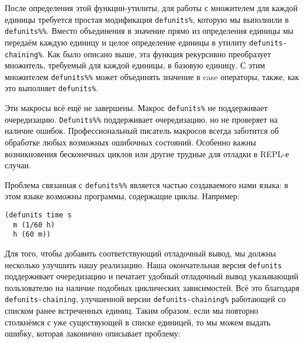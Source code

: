 После определения этой функции-утилиты, для работы с множителем для каждой единицы требуется простая модификация \verb"defunits%", которую мы выполнили в \verb"defunits%%". Вместо объединения в значение прямо из определения единицы мы передаём каждую единицу и целое определение единицы в утилиту \verb"defunits-chaining%". Как было описано выше, эта функция рекурсивно преобразует множитель, требуемый для каждой единицы, в базовую единицу. С этим множителем \verb"defunits%%" может объединять значение в case операторы, также, как это выполняет \verb"defunits%".

Эти макросы всё ещё не завершены. Макрос \verb"defunits%" не поддерживает очередизацию. \verb"Defunits%%" поддерживает очередизацию, но не проверяет на наличие ошибок. Профессиональный писатель макросов всегда заботится об обработке любых возможных ошибочных состояний. Особенно важны возникновения бесконечных циклов или другие трудные для отладки в REPL-е случаи.

Проблема связанная с \verb"defunits%%" является частью создаваемого нами языка: в этом языке возможны программы, содержащие циклы. Например:

\begin{verbatim}
(defunits time s
  m (1/60 h)
  h (60 m))
\end{verbatim}

Для того, чтобы добавить соответствующий отладочный вывод, мы должны несколько улучшить нашу реализацию. Наша окончательная версия \verb"defunits" поддерживает очередизацию и печатает удобный отладочный вывод указывающий пользователю на наличие подобных циклических зависимостей. Всё это благодаря \verb"defunits-chaining", улучшенной версии \verb"defunits-chaining%" работающей со списком ранее встреченных единиц. Таким образом, если мы повторно столкнёмся с уже существующей в списке единицей, то мы можем выдать ошибку, которая лаконично описывает проблему:

